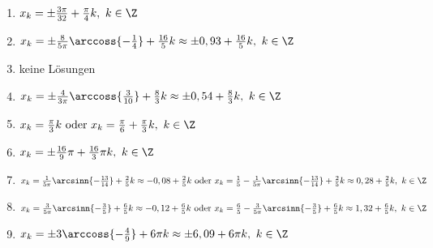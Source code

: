 \begin{Answer}[ref=sincosGleichungenAllgA1]
\begin{enumerate}[label=\alph*)]
		\item \(x_k=\pm \frac{3\pi}{32} +\frac{\pi}{4} k,\ k\in\Z\)
		\item \(x_k=\pm \frac{8}{5\pi}\arccoss{-\frac{1}{4}} +\frac{16}{5} k\approx\pm 0,93 +\frac{16}{5} k,\ k\in\Z\)
		\item keine Lösungen
		\item \(x_k=\pm \frac{4}{3\pi}\arccoss{\frac{3}{10}} +\frac{8}{3} k\approx\pm 0,54 +\frac{8}{3} k,\ k\in\Z\)
		\item \(x_k=\frac{\pi}{3} k\text{ oder }x_k=\frac{\pi}{6} +\frac{\pi}{3} k,\ k\in\Z\)
		\item \(x_k=\pm \frac{16}{9}\pi +\frac{16}{3}\pi k,\ k\in\Z\)
		\item \(x_k=\frac{1}{5\pi}\arcsinn{-\frac{13}{14}} +\frac{2}{5} k\approx -0,08+\frac{2}{5} k\text{ oder }x_k=\frac{1}{5}-\frac{1}{5\pi}\arcsinn{-\frac{13}{14}} +\frac{2}{5} k\approx 0,28+\frac{2}{5} k,\ k\in\Z\)
		\item \(x_k=\frac{3}{5\pi}\arcsinn{-\frac{3}{5}} +\frac{6}{5} k\approx -0,12+\frac{6}{5} k\text{ oder }x_k=\frac{6}{5}-\frac{3}{5\pi}\arcsinn{-\frac{3}{5}} +\frac{6}{5} k\approx 1,32+\frac{6}{5} k,\ k\in\Z\)
		\item \(x_k=\pm 3\arccoss{-\frac{4}{9}} +6\pi k\approx \pm 6,09 +6\pi k,\ k\in\Z\)
	\end{enumerate}
\end{Answer}